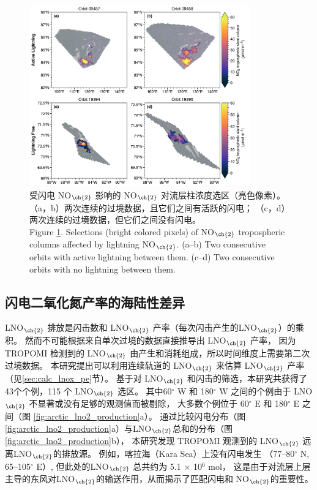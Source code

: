 \begin{figure}[H]
\centering
\includegraphics[width=0.85\textwidth]{./figures/arctic_consecutive_orbits.png}
\caption{
受闪电 NO$_{\ch{2}}$ 影响的 NO$_{\ch{2}}$ 对流层柱浓度选区（亮色像素）。
（a，b）两次连续的过境数据，且它们之间有活跃的闪电；
（c，d）两次连续的过境数据，但它们之间没有闪电。\\
Figure \ref{fig:consecutive_orbits}.
Selections (bright colored pixels) of NO$_{\ch{2}}$ tropospheric columns affected by lightning NO$_{\ch{2}}$.
(a--b) Two consecutive orbits with active lightning between them.
(c--d) Two consecutive orbits with no lightning between them.
}
\label{fig:consecutive_orbits}
\end{figure}


\subsection{闪电二氧化氮产率的海陆性差异}


LNO$_{\ch{2}}$ 排放是闪击数和 LNO$_{\ch{2}}$ 产率（每次闪击产生的LNO$_{\ch{2}}$）的乘积。
然而不可能根据来自单次过境的数据直接推导出 LNO$_{\ch{2}}$ 产率，
因为 TROPOMI 检测到的 LNO$_{\ch{2}}$ 由产生和消耗组成，所以时间维度上需要第二次过境数据。
本研究提出可以利用连续轨道的 LNO$_{\ch{2}}$ 来估算 LNO$_{\ch{2}}$ 产率（见\ref{sec:calc_lnox_pe}节）。
基于对 LNO$_{\ch{2}}$ 和闪击的筛选，本研究共获得了43个个例，115 个 LNO$_{\ch{2}}$ 选区。
其中60$^{\circ}$ W 和 180$^{\circ}$ W 之间的个例由于 LNO$_{\ch{2}}$ 不显著或没有足够的观测值而被剔除，
大多数个例位于 60$^{\circ}$ E 和 180$^{\circ}$ E 之间（图 \ref{fig:arctic_lno2_production}a）。
通过比较闪电分布（图 \ref{fig:arctic_lno2_production}a）与LNO$_{\ch{2}}$总和的分布（图 \ref{fig:arctic_lno2_production}b），
本研究发现 TROPOMI 观测到的 LNO$_{\ch{2}}$ 远离LNO$_{\ch{2}}$的排放源。
例如，喀拉海（Kara Sea）上没有闪电发生 （77--80$^{\circ}$ N, 65--105$^{\circ}$ E）,
但此处的LNO$_{\ch{2}}$ 总共约为 5.1 $\times$ 10$^6$ mol，
这是由于对流层上层主导的东风对LNO$_{\ch{2}}$的输送作用，从而揭示了匹配闪电和 NO$_{\ch{2}}$的重要性。


